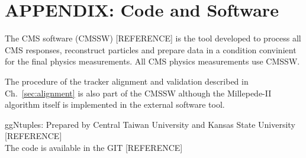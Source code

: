 \section{APPENDIX: Code and Software}
\label{sec:Code}


The CMS software (CMSSW) [REFERENCE] is the tool developed to process all CMS responses, reconstruct particles and prepare data in a condition convinient for the final physics measurements. All CMS physics measurements use CMSSW.

The procedure of the tracker alignment and validation described in Ch.~\ref{sec:alignment} is also part of the CMSSW although the Millepede-II algorithm itself is implemented in the external software tool.

ggNtuples:
Prepared by Central Taiwan University and Kansas State University [REFERENCE]\\
The code is available in the GIT [REFERENCE]

